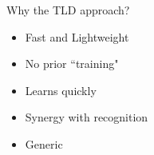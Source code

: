 \documentclass[mathserif]{beamer}
\begin{document}
\begin{frame}{Why the TLD approach?}
    \begin{itemize}
      \setlength\itemsep{1em}
       \item \hspace{0pt}
          \pause Fast and Lightweight
       \item \hspace{0pt}
          \pause No prior ``training"
       \item \hspace{0pt}
          \pause Learns quickly
       \item \hspace{0pt}
          \pause Synergy with recognition
       \item \hspace{0pt}
          \pause Generic
    \end{itemize}

\end{frame}
\end{document}
